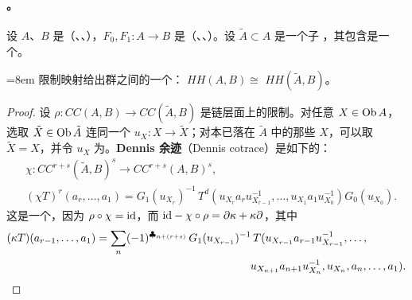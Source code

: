 \paragraph{\trMorita\trInvariance。}\label{sub:morita-invariance}
设 $A$、$B$ 是（\trLinear、\trGraded、\trUnital）\trCategory，$F_0,F_1\colon A\to B$
是（\trLinear、\trGraded、\trUnital）\trFunctor。设 $\tilde{A}\subset A$ 是一个子%
\trCategory，其包含\trFunctor{}是一个\trEquivalence。
\begin{lemma}\label{thm:restriction-hochschild-iso}
\begingroup\emergencystretch=8em
限制映射给出\trHochschildCohomology{}群之间的一个\trIsomorphism{}：
$\mathit{HH}(A,B)\cong$ $\mathit{HH}(\tilde{A},B)$。
\par\endgroup
\end{lemma}
\begin{proof}
设 $\rho\colon\mathit{CC}(A,B)\to\mathit{CC}(\tilde{A},B)$ 是链层面上的限制。对任意
$X\in\operatorname{Ob} A$，选取 $\tilde{X}\in\operatorname{Ob}\tilde{A}$ 连同一个\trIsomorphism{}%
$u_X\colon X\to\tilde{X}$；对本已落在 $\tilde{A}$ 中的那些\trObject{} $X$，可以取
$\tilde{X}=X$，并令 $u_X$ 为\trIdentityMorphism。\textbf{Dennis 余迹}（Dennis
cotrace）是如下的\trChainMap：
\begin{equation*}
\begin{aligned}
&\chi\colon\mathit{CC}^{r+s}(\tilde{A},B)^s
  \longrightarrow\mathit{CC}^{r+s}(A,B)^s,\\
&(\chi T)^r(a_r,\ldots,a_1)
=G_1(u_{X_r})^{-1}\,T^d(u_{X_r}a_ru_{X_{r-1}}^{-1},\ldots,
  u_{X_1}a_1u_{X_0}^{-1})G_0(u_{X_0}).
\end{aligned}
\end{equation*}
这是一个\trHomotopyEquivalence，因为 $\rho\circ\chi=\mathrm{id}$，而
$\mathrm{id}-\chi\circ\rho=\partial\kappa+\kappa\partial$，其中
\begin{equation*}
\begin{split}
(\kappa T)(a_{r-1},\ldots,a_1)
&=\sum_n(-1)^{\clubsuit_{n+(r+s)}}\,G_1(u_{X_{r-1}})^{-1}\,
  T(u_{X_{r-1}}a_{r-1}u_{X_{r-1}}^{-1},\ldots,\\
&\hspace{14em}u_{X_{n+1}}a_{n+1}u_{X_n}^{-1},u_{X_n},a_n,\ldots,a_1).
\qedhere
\end{split}
\end{equation*}
\end{proof}

